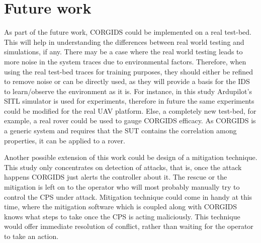 \section{Future work}
As part of the future work, CORGIDS could be implemented on a real test-bed. This will help in understanding the differences between real world testing and simulations, if any. There may be a case where the real world testing leads to more noise in the system traces due to environmental factors. Therefore, when using the real test-bed traces for training purposes, they should either be refined to remove noise or can be directly used, as they will provide a basis for the IDS to learn/observe the environment as it is. For instance, in this study Ardupilot's \ac{SITL} simulator is used for experiments, therefore in future the same experiments could be modified for the real UAV platform. Else, a completely new test-bed, for example, a real rover could be used to gauge \ac{CORGIDS} efficacy. As \ac{CORGIDS} is a generic system and requires that the \ac{SUT} contains the correlation among properties, it can be applied to a rover.

Another possible extension of this work could be design of a mitigation technique. This study only concentrates on detection of attacks, that is, once the attack happens \ac{CORGIDS} just alerts the controller about it. The rescue or the mitigation is left on to the operator who will most probably manually try to control the \ac{CPS} under attack. Mitigation technique could come in handy at this time, where the mitigation software which is coupled along with \ac{CORGIDS} knows what steps to take once the \ac{CPS} is acting maliciously. This technique would offer immediate resolution of conflict, rather than waiting for the operator to take an action.

 \endinput
